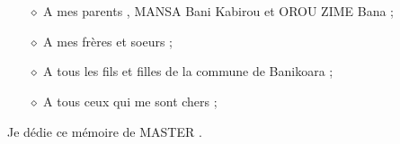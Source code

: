 \documentclass[12pt,a4paper, openany]{report}
\begin{document}
	\restoregeometry
	\newpage
	
	\begin{spacing}{1.5}
	\end{spacing}
		
	\chapter*{\color{green!30!blue}{Dédicace}}
	\begin{flushleft}
		\begin{enumerate}
			\item [$\diamond$] A mes parents , MANSA Bani Kabirou et OROU ZIME Bana ;
			\item [$\diamond$] A mes frères et soeurs ;
			\item [$\diamond$] A tous les fils et filles de la commune de Banikoara ;
			\item [$\diamond$] A tous ceux qui me sont chers ;
		\end{enumerate}
	\end{flushleft}
Je dédie ce mémoire de MASTER .
	
\end{document}
